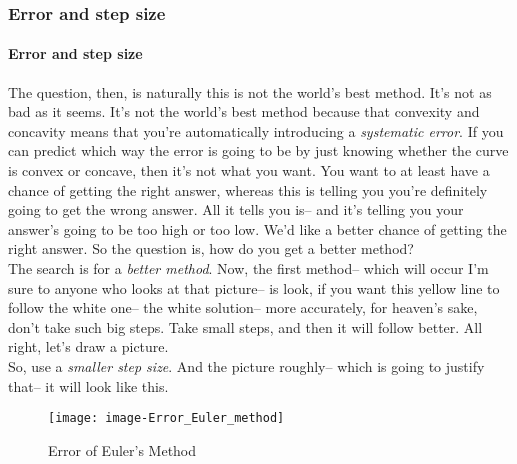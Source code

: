 \clearpage

\subsubsection{Error and step size}

\paragraph{Error and step size}
The question, then, is naturally this is not the world's best method.
It's not as bad as it seems.
It's not the world's best method because that convexity
and concavity means that you're automatically introducing a \emph{systematic error}.
If you can predict which way the error is
going to be by just knowing whether the curve is convex or concave, then it's not what you want.
You want to at least have a chance of getting
the right answer, whereas this is telling you you're definitely going to get the wrong answer.
All it tells you is--
and it's telling you your answer's going to be too high or too low.
We'd like a better chance of getting the right answer.
So the question is, how do you get a better method? \\

The search is for a \emph{better method}.
Now, the first method--
which will occur I'm sure to anyone
who looks at that picture--
is look, if you want this yellow line to follow the white one--
the white solution-- more accurately, for heaven's sake,
don't take such big steps.
Take small steps, and then it will follow better.
All right, let's draw a picture. \\

So, use a \emph{smaller step size}.
And the picture roughly-- which is
going to justify that-- it will look like this.

\begin{wrapfigure}{r}{5.5cm}
  \texttt{[image: image-Error\_Euler\_method]}
  \caption{Error of Euler's Method}
\end{wrapfigure}

